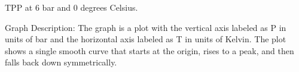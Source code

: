 TPP at 6 bar and 0 degrees Celsius.

Graph Description:
The graph is a plot with the vertical axis labeled as P in units of bar and the horizontal axis labeled as T in units of Kelvin. The plot shows a single smooth curve that starts at the origin, rises to a peak, and then falls back down symmetrically.